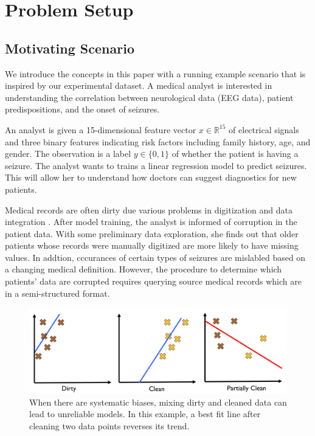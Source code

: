 \section{Problem Setup}\label{background}
\subsection{Motivating Scenario}
We introduce the concepts in this paper with a running example scenario that is inspired by our experimental dataset.
A medical analyst is interested in understanding the correlation between neurological data (EEG data), patient predispositions, and the onset of seizures.

\begin{example}
An analyst is given a 15-dimensional feature vector $x \in \mathbb{R}^{15}$ of electrical signals and three binary features indicating risk factors including family history, age, and gender.
The observation is a label $y\in \{0,1\}$ of whether the patient is having a seizure.
The analyst wants to trains a linear regression model to predict seizures.
This will allow her to understand how doctors can suggest diagnostics for new patients.

Medical records are often dirty due various problems in digitization and data integration \cite{fortunearticle}.
After model training, the analyst is informed of corruption in the patient data.
With some preliminary data exploration, she finds out that older patients whose records were manually digitized are more likely to have missing values.
In addtion, cccurances of certain types of seizures are mislabled based on a changing medical definition.
However, the procedure to determine which patients' data are corrupted requires querying source medical records which are in a semi-structured format.
\end{example}

\begin{figure}[ht!]
\centering
 \includegraphics[width=\columnwidth]{figs/update-arch.png}
 \caption{When there are systematic biases, mixing dirty and cleaned data can lead to unreliable models. In this example, a best fit line after cleaning two data points reverses its trend.\label{update-arch1}}
\end{figure}


